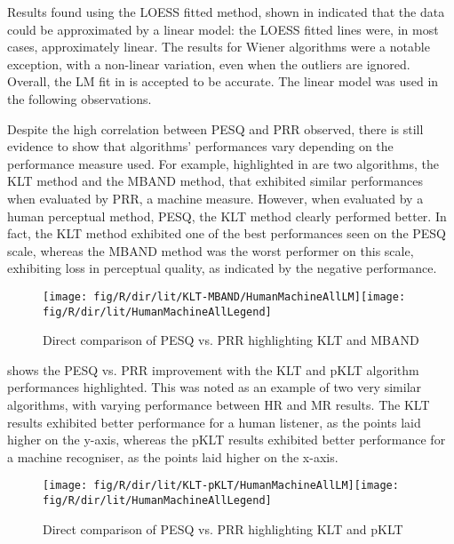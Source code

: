 Results found using the \ac{LOESS} fitted method, shown in 
indicated that the data could be approximated by a linear model: the
\ac{LOESS} fitted lines were, in most cases, approximately linear.
The results for Wiener algorithms were a notable exception, with a
non-linear variation, even when the outliers are ignored. Overall,
the \ac{LM} fit in  is accepted to be
accurate. The linear model was used in the following observations.

Despite the high correlation between \ac{PESQ} and \ac{PRR} observed,
there is still evidence to show that algorithms' performances vary
depending on the performance measure used. For example, highlighted
in  are two algorithms, the \ac{KLT} method
and the \ac{MBAND} method, that exhibited similar performances when
evaluated by \ac{PRR}, a machine measure. However, when evaluated
by a human perceptual method, \ac{PESQ}, the \ac{KLT} method clearly
performed better. In fact, the \ac{KLT} method exhibited one of the
best performances seen on the \ac{PESQ} scale, whereas the \ac{MBAND}
method was the worst performer on this scale, exhibiting loss in perceptual
quality, as indicated by the negative performance.

\begin{figure}[h]
\noindent \begin{centering}
\texttt{[image: fig/R/dir/lit/KLT-MBAND/HumanMachineAllLM]}\texttt{[image: fig/R/dir/lit/HumanMachineAllLegend]}
\par\end{centering}

\protect\caption{\label{fig:direct-klt-mband}Direct comparison of \acs{PESQ} vs.
\acs{PRR} highlighting \acs{KLT} and \acs{MBAND}}
\end{figure}


 shows the \ac{PESQ} vs. \ac{PRR} improvement
with the \ac{KLT} and \ac{pKLT} algorithm performances highlighted.
This was noted as an example of two very similar algorithms, with
varying performance between \ac{HR} and \ac{MR} results. The \ac{KLT}
results exhibited better performance for a human listener, as the
points laid higher on the y-axis, whereas the \ac{pKLT} results exhibited
better performance for a machine recogniser, as the points laid higher
on the x-axis.

\begin{figure}[p]
\noindent \begin{centering}
\texttt{[image: fig/R/dir/lit/KLT-pKLT/HumanMachineAllLM]}\texttt{[image: fig/R/dir/lit/HumanMachineAllLegend]}
\par\end{centering}

\protect\caption{\label{fig:direct-klt-pklt}Direct comparison of \acs{PESQ} vs. \acs{PRR}
highlighting \acs{KLT} and \acs{pKLT}}
\end{figure}


